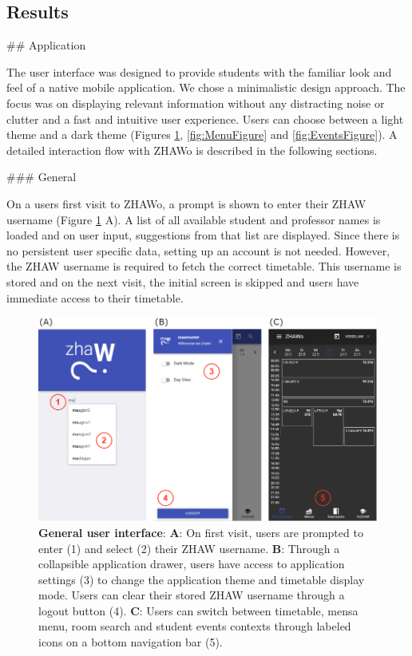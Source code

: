 \begin{markdown}
\section{Results} \label{results}

## Application

The user interface was designed to provide students with the familiar look and feel of a native mobile application. We chose a minimalistic design approach. The focus was on displaying relevant information without any distracting noise or clutter and a fast and intuitive user experience. Users can choose between a light theme and a dark theme (Figures \ref{fig:LoginFigure}, \ref{fig:MenuFigure} and \ref{fig:EventsFigure}). A detailed interaction flow with ZHAWo is described in the following sections.

### General

On a users first visit to ZHAWo, a prompt is shown to enter their ZHAW username (Figure \ref{fig:LoginFigure} A). A list of all available student and professor names is loaded and on user input, suggestions from that list are displayed. Since there is no persistent user specific data, setting up an account is not needed. However, the ZHAW username is required to fetch the correct timetable. This username is stored and on the next visit, the initial screen is skipped and users have immediate access to their timetable.

\begin{figure}[H]
  \includegraphics[width=16cm, center]{./figures/login_figure.png}
  \captionsetup{width=15.5cm}
  \caption[General user interface]{\textbf{General user interface}: \textbf{A}: On first visit, users are prompted to enter (1) and select (2) their ZHAW username. \textbf{B}: Through a collapsible application drawer, users have access to application settings (3) to change the application theme and timetable display mode. Users can clear their stored ZHAW username through a logout button (4). \textbf{C}: Users can switch between timetable, mensa menu, room search and student events contexts through labeled icons on a bottom navigation bar (5).}
  \label{fig:LoginFigure}
\end{figure}


\end{markdown}
